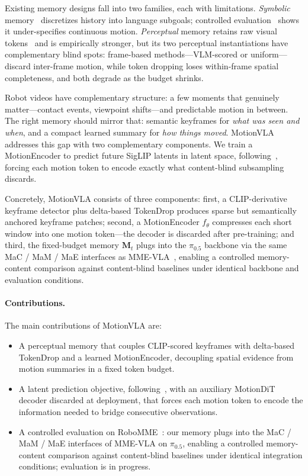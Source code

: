 \documentclass{article}
\begin{document}
Existing memory designs fall into two families, each with limitations.
\emph{Symbolic} memory~\citep{bu2025univla,sridhar2025memer,geminiroboticsTeam2025gemini15}
discretizes history into language subgoals; controlled evaluation~\citep{dai2026robomme}
shows it under-specifies continuous motion. \emph{Perceptual} memory retains
raw visual tokens~\citep{jang2025contextvla,koo2025hamlet,fang2025sam2act,shi2026memoryvla,physicalintelligence2026mem}
and is empirically stronger, but its two perceptual instantiations have
complementary blind spots: frame-based methods---VLM-scored or uniform---discard
inter-frame motion, while token dropping loses within-frame spatial completeness,
and both degrade as the budget shrinks.

Robot videos have complementary structure: a few moments that genuinely
matter---contact events, viewpoint shifts---and predictable motion in between.
The right memory should mirror that: semantic keyframes for \emph{what was
seen and when}, and a compact learned summary for \emph{how things moved}.
MotionVLA addresses this gap with two complementary components.
We train a MotionEncoder to predict future SigLIP latents in latent
space, following~\citet{assran2023ijepa}, forcing each motion token to
encode exactly what content-blind subsampling discards.

Concretely, MotionVLA consists of three components: first, a CLIP-derivative keyframe detector plus delta-based
TokenDrop produces sparse but semantically anchored keyframe patches;
second, a MotionEncoder $f_\theta$ compresses each short window into one motion
token---the decoder is discarded after pre-training; and third, the fixed-budget memory
$\mathbf{M}_t$ plugs into the $\pi_{0.5}$ backbone via the same MaC / MaM /
MaE interfaces as MME-VLA~\citep{dai2026robomme}, enabling a controlled
memory-content comparison against content-blind baselines under identical
backbone and evaluation conditions.

\paragraph{Contributions.}
The main contributions of MotionVLA are:
\begin{itemize}
    \item A perceptual memory that couples CLIP-scored keyframes with
          delta-based TokenDrop and a learned MotionEncoder, decoupling
          spatial evidence from motion summaries in a fixed token budget.
    \item A latent prediction objective, following~\citet{assran2023ijepa},
          with an auxiliary MotionDiT decoder discarded at deployment,
          that forces each motion token to encode the information needed
          to bridge consecutive observations.
    \item A controlled evaluation on RoboMME~\citep{dai2026robomme}:
          our memory plugs into the MaC / MaM / MaE interfaces of
          MME-VLA on $\pi_{0.5}$, enabling a controlled memory-content comparison
          against content-blind baselines under identical integration conditions; evaluation is in progress.
\end{itemize}
\end{document}
